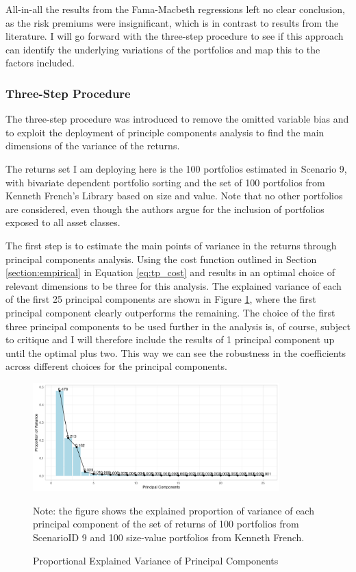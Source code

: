 All-in-all the results from the Fama-Macbeth regressions left no clear conclusion, as the risk premiums were insignificant, which is in contrast to results from the literature. I will go forward with the three-step procedure to see if this approach can identify the underlying variations of the portfolios and map this to the factors included.

\subsubsection{Three-Step Procedure}

The three-step procedure was introduced to remove the omitted variable bias and to exploit the deployment of principle components analysis to find the main dimensions of the variance of the returns. 

The returns set I am deploying here is the 100 portfolios estimated in Scenario 9, with bivariate dependent portfolio sorting and the set of 100 portfolios from Kenneth French's Library based on size and value. Note that no other portfolios are considered, even though the authors argue for the inclusion of portfolios exposed to all asset classes.

The first step is to estimate the main points of variance in the returns through principal components analysis. Using the cost function outlined in Section \ref{section:empirical} in Equation \ref{eq:tp_cost} and results in an optimal choice of relevant dimensions to be three for this analysis. The explained variance of each of the first 25 principal components are shown in Figure \ref{fig:explainedvariance_9}, where the first principal component clearly outperforms the remaining. The choice of the first three principal components to be used further in the analysis is, of course, subject to critique and I will therefore include the results of 1 principal component up until the optimal plus two. This way we can see the robustness in the coefficients across different choices for the principal components.

\begin{figure}[h]
	\centering
	\caption[Proportional Explained Variance]{Proportional Explained Variance of Principal Components}
	\label{fig:explainedvariance_9}
	
	\includegraphics[width=0.85\textwidth]{./Plots/principalcomponents_proportionvar_9.png}
	
	{\small Note: the figure shows the explained proportion of variance of each principal component of the set of returns of 100 portfolios from ScenarioID 9 and 100 size-value portfolios from Kenneth French.}
\end{figure}

